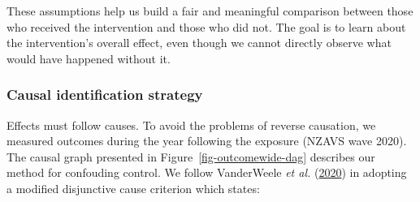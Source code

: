 \documentclass[
  singlecolumn,
  9pt]{article}
\begin{document}
These assumptions help us build a fair and meaningful comparison between
those who received the intervention and those who did not. The goal is
to learn about the intervention's overall effect, even though we cannot
directly observe what would have happened without it.

\subsubsection{Causal identification
strategy}\label{causal-identification-strategy}

Effects must follow causes. To avoid the problems of reverse causation,
we measured outcomes during the year following the exposure (NZAVS wave
2020). The causal graph presented in Figure~\ref{fig-outcomewide-dag}
describes our method for confouding control. We follow VanderWeele
\emph{et al.} (\hyperref[ref-vanderweele2020]{2020}) in adopting a
modified disjunctive cause criterion which states:
\end{document}

